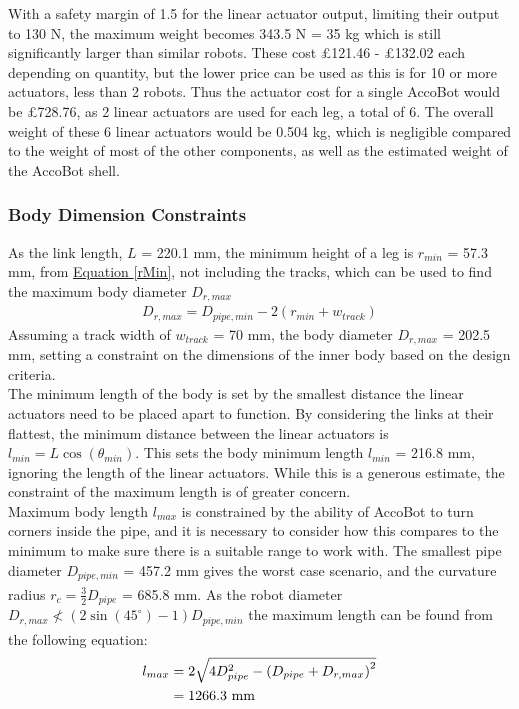 \documentclass[11pt]{article}		%
\newcommand{\supercite}[1]{\textsuperscript{\cite{#1}}}		%
\newcommand{\equationref}[1]{\hyperref[#1]{Equation \ref*{#1}}}     %
\begin{document}
				With a safety margin of 1.5 for the linear actuator output, limiting their output to 130 N, the maximum weight becomes 343.5 N = 35 kg which is still significantly larger than similar robots.
				These cost £121.46 - £132.02 each depending on quantity, but the lower price can be used as this is for 10 or more actuators, less than 2 robots.
				Thus the actuator cost for a single AccoBot would be £728.76, as 2 linear actuators are used for each leg, a total of 6.
				The overall weight of these 6 linear actuators would be 0.504 kg, which is negligible compared to the weight of most of the other components, as well as the estimated weight of the AccoBot shell.
				
			\subsubsection{Body Dimension Constraints}
			
    		    As the link length, $L$ = 220.1 mm, the minimum height of a leg is $r_{min}$ = 57.3 mm, from \equationref{rMin}, not including the tracks, which can be used to find the maximum body diameter $D_{r,max}$
    			\begin{align}
    				D_{r,max} = D_{pipe,min} - 2 \left(r_{min} + w_{track} \right)
    			\end{align}
    			Assuming a track width of $w_{track}$ = 70 mm, the body diameter $D_{r,max}$ = 202.5 mm, setting a constraint on the dimensions of the inner body based on the design criteria.
    			\\
                \hspace*{2ex}The minimum length of the body is set by the smallest distance the linear actuators need to be placed apart to function.
    			By considering the links at their flattest, the minimum distance between the linear actuators is $l_{min} = L \cos \left( \theta_{min} \right)$.
    			This sets the body minimum length $l_{min}$ =  216.8 mm, ignoring the length of the linear actuators.
    			While this is a generous estimate, the constraint of the maximum length is of greater concern.
    			\\
                \hspace*{2ex}Maximum body length $l_{max}$ is constrained by the ability of AccoBot to turn corners inside the pipe, and it is necessary to consider how this compares to the minimum to make sure there is a suitable range to work with.
    			The smallest pipe diameter $D_{pipe,min}$ = 457.2 mm gives the worst case scenario, and the curvature radius $r_c = \frac{3}{2} D_{pipe}$\supercite{roh2005differential} = 685.8 mm.
    			As the robot diameter $D_{r,max} \nless \left( 2 \sin \left( 45^\circ \right) - 1 \right) D_{pipe,min}$ the maximum length can be found from the following equation\supercite{roh2005differential}:
    			\begin{align}
    				l_{max} &= 2 \sqrt{4D_{pipe}^2 - \left( D_{pipe} + D_{r,max}\right) ^ 2}
    				\\
    				&= 1266.3 \ \mathrm{mm} \notag
    			\end{align}
			
\end{document}
